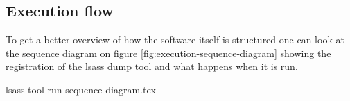 \documentclass{article}
\begin{document}
\subsection{Execution flow}
To get a better overview of how the software itself is structured one can look at the sequence diagram on figure \ref{fig:execution-sequence-diagram} showing the registration of the \gls{lsass} dump tool and what happens when it is run.

{lsass-tool-run-sequence-diagram.tex}
\end{document}

